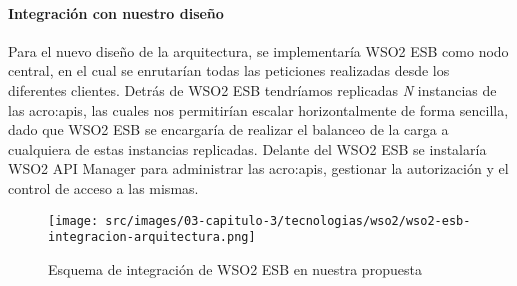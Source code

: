 \paragraph{Integración con nuestro diseño}

Para el nuevo diseño de la arquitectura, se implementaría WSO2 ESB como nodo central, en el cual se enrutarían todas las peticiones realizadas desde los diferentes clientes.  Detrás de WSO2 ESB tendríamos replicadas \textit{N} instancias de las \glspl{acro:api}, las cuales nos permitirían escalar horizontalmente de forma sencilla, dado que WSO2 ESB se encargaría de realizar el balanceo de la carga a cualquiera de estas instancias replicadas.  Delante del WSO2 ESB se instalaría WSO2 API Manager para administrar las \glspl{acro:api}, gestionar la autorización y el control de acceso a las mismas.

\begin{figure}[H]
  \texttt{[image: src/images/03-capitulo-3/tecnologias/wso2/wso2-esb-integracion-arquitectura.png]}
  \caption{Esquema de integración de WSO2 ESB en nuestra propuesta}
  \label{fig:integracion-wso2-esb-arquitectura}
\end{figure}
